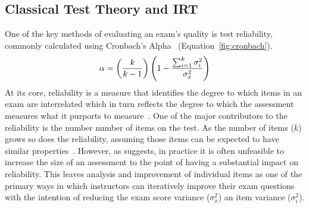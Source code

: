 \documentclass[]{acmart}
\begin{document}
\subsection{Classical Test Theory and IRT}

One of the key methods of evaluating an exam's quality is test reliability,
commonly calculated using Cronbach's Alpha~\cite{cronbach1951coefficient}
(Equation~\ref{fig:cronbach}). 
\begin{equation}
    \alpha =\left({k \over k-1}\right)\left(1-{\sum _{i=1}^{k}\sigma
    _{i}^{2} \over \sigma _{x}^{2}}\right)
\end{equation}\label{fig:cronbach}
At its core, reliability is a measure that identifies the degree to which
items in an exam are interrelated which in turn reflects the degree to which the
assessment measures what it purports to measure~\cite{lord2008statistical,
ebel1967relation, ebel1972essentials}.  
One of the major contributors to the reliability is the number number of items on
the test. As the number of items ($k$) grows so does the reliability, assuming those items can be expected to have
similar properties~\cite{ebel1967relation, allen2001introduction, ebel1972essentials}.
However, as \citet{ebel1967relation} suggests, in practice it is often
unfeasible to increase the size of an assessment to the point of having a
substantial impact on reliability. This leaves 
analysis and improvement of individual items as one of the primary ways in
which instructors can iteratively improve their exam questions with the
intention of reducing the exam score variance ($\sigma^2_x$) an item variance 
($\sigma^2_i$).
\end{document}
